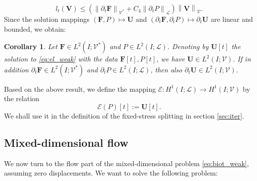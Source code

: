 \documentclass[a4paper]{article}
\newtheorem{corollary}[theorem]{Corollary}
\numberwithin{equation}{section}
\def\dt{\prtl_t}
\def\FF{\vc F}
\def\Hf{\mathscr{L}} %
\def\norm#1{\left\|#1\right\|}
\def\prtl{\partial}
\def\U{\vc U}
\def\V{\vc V}
\def\Vel{{\boldsymbol{\mathcal V}}} %
\def\Vf{{\mathcal V}} %
\def\vc#1{\mathbf{#1}}     %
\newcommand{\eqs}[1]{\begin{equation*}#1\end{equation*}}
\begin{document}
\eqs{ l_t(\V) \le \left(\norm{\dt\FF}_{\Vel^*} + C_4\norm{\dt P}_\Hf\right)\norm{\V}_\Vel. }
Since the solution mappings $(\FF,P) \mapsto \U$ and $(\dt\FF,\dt P)\mapsto\dt\U$ are linear and bounded, we obtain:
\begin{corollary}
Let $\FF\in L^2( I;\Vel^*)$ and $P\in L^2( I;\Hf)$.
Denoting by $\U[t]$ the solution to \eqref{eq:el_weak} with the data $\FF[t],P[t]$, we have $\U\in L^2( I;\Vel)$.
If in addition $\dt\FF\in L^2( I;\Vel^*)$ and $\dt P\in L^2( I;\Hf)$, then also $\dt\U\in L^2( I;\Vel)$.
\end{corollary}
% 
Based on the above result, we define the mapping $\mathcal E: H^1( I;\Hf)\to H^1( I;\Vel)$ by the relation
\eqs{ \mathcal E(P)[t] := \U[t]. }
We shall use it in the definition of the fixed-stress splitting in section \ref{sec:iter}.


\subsection{Mixed-dimensional flow}\label{sec:wellposedness_flow}

We now turn to the flow part of the mixed-dimensional problem \eqref{eq:biot_weak}, assuming zero displacements.
We want to solve the following problem:
\end{document}
